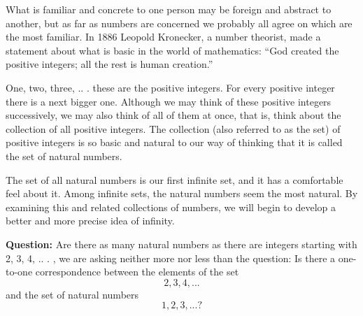 What is familiar and concrete to one person may be foreign and abstract to another, but as far as numbers are concerned we probably all agree on which are the most familiar. In 1886 Leopold Kronecker, a number theorist, made a statement about what is basic in the world of mathematics: ``God created the positive integers; all the rest is human creation.''

One, two, three, .. . these are the positive integers. For every positive integer there is a next bigger one. Although we may think of these positive integers successively, we may also think of all of them at once, that is, think about the collection of all positive integers. The collection (also referred to as the set) of positive integers is so basic and natural to our way of thinking that it is called the set of natural numbers.

The set of all natural numbers is our first infinite set, and it has a comfortable feel about it. Among infinite sets, the natural numbers seem the most natural. By examining this and related collections of numbers, we will begin to develop a better and more precise idea of infinity.


\noindent \textbf{Question:} Are there as many natural numbers as there are integers starting with 2, 3, 4, .. . , we are asking neither more nor less than the question: Is there a one-to-one correspondence
between the elements of the set 
\[2, 3, 4, .. .\]
and the set of natural numbers
\[1, 2, 3, .. . ?\]
\clearpage

